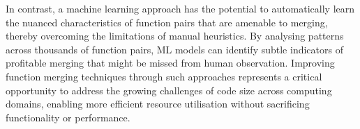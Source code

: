In contrast, a machine learning approach has the potential to automatically learn the nuanced characteristics of function pairs that are amenable to merging, thereby overcoming the limitations of manual heuristics. By analysing patterns across thousands of function pairs, ML models can identify subtle indicators of profitable merging that might be missed from human observation. Improving function merging techniques through such approaches represents a critical opportunity to address the growing challenges of code size across computing domains, enabling more efficient resource utilisation without sacrificing functionality or performance.



